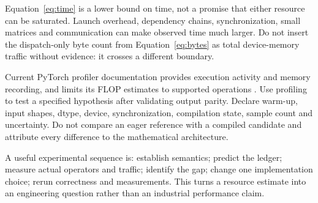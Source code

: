 Equation~\ref{eq:time} is a lower bound on time, not a promise that either resource
can be saturated. Launch overhead, dependency chains, synchronization,
small matrices and communication can make observed time much larger.
Do not insert the dispatch-only byte count from Equation~\ref{eq:bytes}
as total device-memory traffic without evidence: it crosses a different boundary.

Current PyTorch profiler documentation provides execution activity and memory
recording, and limits its FLOP estimates to supported operations \cite{profiler}.
Use profiling to test a specified hypothesis after validating output parity.
Declare warm-up, input shapes, dtype, device, synchronization, compilation state,
sample count and uncertainty. Do not compare an eager reference with a compiled
candidate and attribute every difference to the mathematical architecture.

A useful experimental sequence is: establish semantics; predict the ledger;
measure actual operators and traffic; identify the gap; change one implementation
choice; rerun correctness and measurements. This turns a resource estimate into
an engineering question rather than an industrial performance claim.

